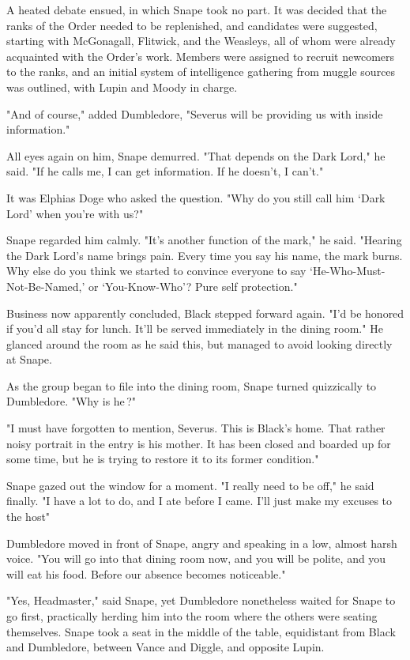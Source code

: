 A heated debate ensued, in which Snape took no part. It was decided that the ranks of the Order needed to be replenished, and candidates were suggested, starting with McGonagall, Flitwick, and the Weasleys, all of whom were already acquainted with the Order's work. Members were assigned to recruit newcomers to the ranks, and an initial system of intelligence gathering from muggle sources was outlined, with Lupin and Moody in charge.

"And of course," added Dumbledore, "Severus will be providing us with inside information."

All eyes again on him, Snape demurred. "That depends on the Dark Lord," he said. "If he calls me, I can get information. If he doesn't, I can't."

It was Elphias Doge who asked the question. "Why do you still call him `Dark Lord' when you're with us?"

Snape regarded him calmly. "It's another function of the mark," he said. "Hearing the Dark Lord's name brings pain. Every time you say his name, the mark burns. Why else do you think we started to convince everyone to say `He-Who-Must-Not-Be-Named,' or `You-Know-Who'? Pure self protection."

Business now apparently concluded, Black stepped forward again. "I'd be honored if you'd all stay for lunch. It'll be served immediately in the dining room." He glanced around the room as he said this, but managed to avoid looking directly at Snape.

As the group began to file into the dining room, Snape turned quizzically to Dumbledore. "Why is he{\el}\,?"

"I must have forgotten to mention, Severus. This is Black's home. That rather noisy portrait in the entry is his mother. It has been closed and boarded up for some time, but he is trying to restore it to its former condition."

Snape gazed out the window for a moment. "I really need to be off," he said finally. "I have a lot to do, and I ate before I came. I'll just make my excuses to the host{\el}"

Dumbledore moved in front of Snape, angry and speaking in a low, almost harsh voice. "You will go into that dining room now, and you will be polite, and you will eat his food. Before our absence becomes noticeable."

"Yes, Headmaster," said Snape, yet Dumbledore nonetheless waited for Snape to go first, practically herding him into the room where the others were seating themselves. Snape took a seat in the middle of the table, equidistant from Black and Dumbledore, between Vance and Diggle, and opposite Lupin.

